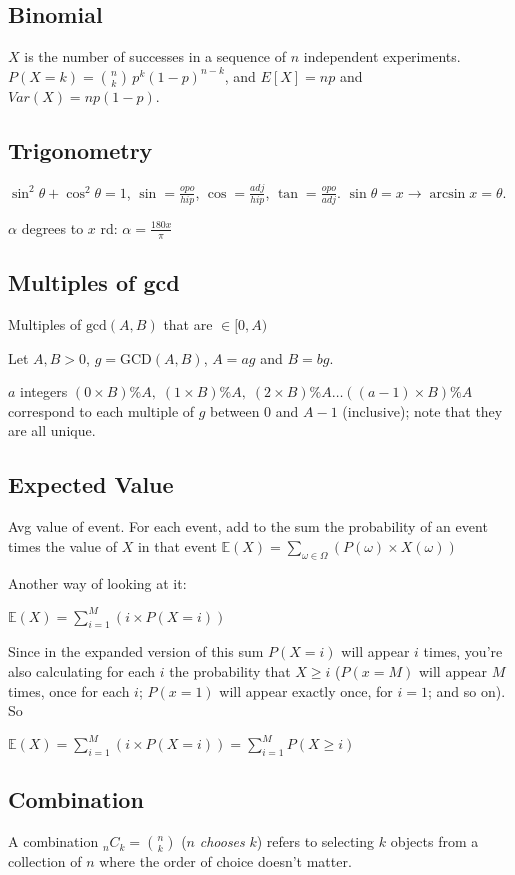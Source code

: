 \documentclass[a4paper]{article}
\begin{document}
\subsection{Binomial}
$X$ is the number of successes in a sequence of $n$ independent experiments.  $P(X = k) = \binom{n}{k}\,p^{k}(1-p)^{n-k}$, and $E[X] = np$ and $Var(X) = np(1-p)$.

\subsection{Trigonometry}
$\sin^2\theta + \cos^2\theta = 1$, $\sin = \frac{opo}{hip}$, $\cos = \frac{adj}{hip}$, $\tan = \frac{opo}{adj}$. $\sin \theta = x \to \arcsin x = \theta$.

$\alpha$ degrees to $x$ rd: $\alpha = \frac{180x}{\pi}$

\subsection{Multiples of gcd}
Multiples of $\textrm{gcd}(A, B)$ that are $\in [0, A)$

Let $A, B > 0$, $g = \textrm{GCD}(A, B)$, $A = ag$ and $B = bg$.

$a$ integers
$(0\times B) \% A,\; (1\times B) \% A,\; (2\times B) \% A \dotsc ((a-1)\times B) \% A$
correspond to each multiple of $g$ between $0$ and $A-1$ (inclusive); note that they
are all unique.

\subsection{Expected Value}
Avg value of event. For each event, add to the sum the probability of an event times the value of $X$ in that event
$\mathbb{E}(X) = \sum_{\omega \in \Omega} (P(\omega)\times X(\omega))$

Another way of looking at it:

$\mathbb{E}(X) = \sum_{i=1}^{M} (i \times P(X=i))$

Since in the expanded version of this sum $P(X=i)$ will appear $i$ times, you're also calculating for each $i$ the probability that $X \geq i$ ($P(x=M)$ will appear $M$ times, once for each $i$; $P(x=1)$ will appear exactly once, for $i=1$; and so on). So

$\mathbb{E}(X) = \sum_{i=1}^{M} (i \times P(X=i)) = \sum_{i=1}^{M} P(X \geq i)$

\subsection{Combination}
A combination ${}_nC_k = \binom{n}{k}$ ($n$ \textit{chooses} $k$) refers to selecting $k$ objects from a collection of $n$ where the order of choice doesn't matter.
\end{document}

